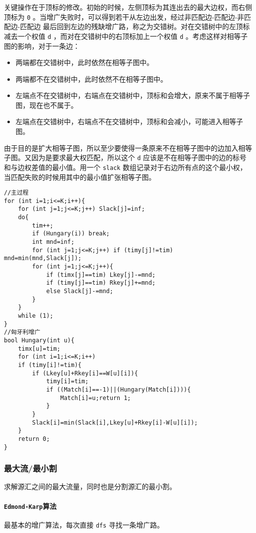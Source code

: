 \documentclass[UTF-8]{ctexart}
\begin{document}
	关键操作在于顶标的修改。初始的时候，左侧顶标为其连出去的最大边权，而右侧顶标为 \texttt{0} 。当增广失败时，可以得到若干从左边出发，经过非匹配边-匹配边-非匹配边-匹配边 最后回到左边的残缺增广路，称之为交错树。对在交错树中的左顶标减去一个权值 \texttt{d} ，而对在交错树中的右顶标加上一个权值 \texttt{d} 。考虑这样对相等子图的影响，对于一条边：
	\begin{itemize}
		\item 两端都在交错树中，此时依然在相等子图中。
		\item 两端都不在交错树中，此时依然不在相等子图中。
		\item 左端点不在交错树中，右端点在交错树中，顶标和会增大，原来不属于相等子图，现在也不属于。
		\item 左端点在交错树中，右端点不在交错树中，顶标和会减小，可能进入相等子图。
	\end{itemize}

	由于目的是扩大相等子图，所以至少要使得一条原来不在相等子图中的边加入相等子图。又因为是要求最大权匹配，所以这个 \texttt{d} 应该是不在相等子图中的边的标号和与边权差值的最小值。用一个 \texttt{slack} 数组记录对于右边所有点的这个最小权，当匹配失败的时候用其中的最小值扩张相等子图。
\begin{verbatim}
//主过程
for (int i=1;i<=K;i++){
    for (int j=1;j<=K;j++) Slack[j]=inf;
    do{
        tim++;
        if (Hungary(i)) break;
        int mnd=inf;
        for (int j=1;j<=K;j++) if (timy[j]!=tim) mnd=min(mnd,Slack[j]);
        for (int j=1;j<=K;j++){
            if (timx[j]==tim) Lkey[j]-=mnd;
            if (timy[j]==tim) Rkey[j]+=mnd;
            else Slack[j]-=mnd;
        }
    }
    while (1);
}
//匈牙利增广
bool Hungary(int u){
    timx[u]=tim;
    for (int i=1;i<=K;i++)
    if (timy[i]!=tim){
        if (Lkey[u]+Rkey[i]==W[u][i]){
            timy[i]=tim;
            if ((Match[i]==-1)||(Hungary(Match[i]))){
                Match[i]=u;return 1;
            }
        }
        Slack[i]=min(Slack[i],Lkey[u]+Rkey[i]-W[u][i]);
    }
    return 0;
}
\end{verbatim}
	\subsubsection{最大流/最小割}
	求解源汇之间的最大流量，同时也是分割源汇的最小割。
	\paragraph{\texttt{Edmond-Karp}算法} 最基本的增广算法，每次直接 \texttt{dfs} 寻找一条增广路。
\end{document}
